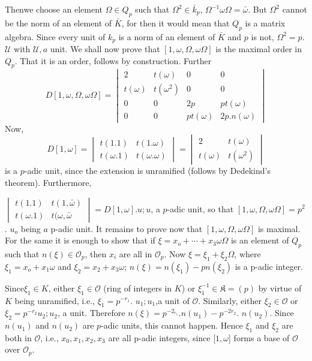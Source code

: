 Then\pageoriginale we choose an element $\Omega \in Q_p$ such that $\Omega^{2}\in
\bar{k}_p$, $\Omega^{-1} \omega \Omega = \bar{\omega}$. But $\Omega^2$
cannot be the norm of an 
element of $\bar{K}$, for then it would mean that $Q_p$ is a matrix
algebra. Since every unit of $k_p$ is a norm of an element of
$\bar{K}$ and $p$ is not, $\Omega^2=p$. $\mathcal{U}$ with
$\mathcal{U},a$ unit. We shall now prove  that $[1, \omega, \Omega,
  \omega \Omega]$ is the maximal order in $Q_p$. That it is an order,
follows by  construction. Further 
$$
D [1, \omega, \Omega, \omega \Omega]=
\begin{vmatrix}
  2 & t(\omega) & 0 &0 \\
  t(\omega) & t(\omega^2) & 0 & 0 \\
  0 & 0 & 2p & pt(\omega) \\
  0 & 0 & pt(\omega) & 2p.n(\omega) 
\end{vmatrix}
$$
Now,
$$
D[1,\omega] = 
\begin{vmatrix}
  t(1.1) & t(1. \omega) \\
  t(\omega. 1) & t(\omega. \omega)
\end{vmatrix} 
=
\begin{vmatrix}
  2 & t(\omega) \\ 
  t(\omega) & t(\omega^2)
\end{vmatrix}
$$
is a $p$-adic unit, since the extension is  unramified (follows by
Dedekind's theorem).  Furthermore, 

$
\begin{vmatrix}
  t(1.1) & t(1, \bar{\omega}) \\
  t(\omega.1) & t(\omega,  \bar{\omega}
\end{vmatrix}
= D[1,\omega]. u; u$,  a  $p$-adic unit,
so that $[1, \omega, \Omega, \omega \Omega]=p^2$. $u_o$ being $a$
p-adic unit. It remains to prove now that $[1, \omega, \Omega, \omega
  \Omega]$ is maximal. For the same it is enough to show that if $\xi
= x_o + \cdots + x_3 \omega \Omega$ is an element of $Q_p$ such that
$n (\xi) \in  \mathscr{O}_p$, then $x_i$ are all in
$\mathscr{O}_p$. Now $\xi = \xi_1 +  \xi_2 \Omega$, where $\xi_1 = x_o
+x_1 \omega$ and $\xi_2 =  x_2 +x_3 \omega$;  $n(\xi)= n(\xi_1)- pn
(\xi_2)$ is a p-adic integer. 

Since\pageoriginale $\xi_1 \in K $, either $\xi_1 \in  \mathscr{O}$ (ring of
integers in $K$) or $\xi^{-1}_1 \in \mathfrak{K} =(p)$ by virtue of $K$
being unramified, i.e., $\xi_1= p^{-r_1}$.  $u_1 ; u_1$,a  unit  of
$\mathscr{O}$. Similarly, either $\xi_2 \in \mathscr{O}$ or $\xi_2
=p^{-r_2} u_2; u_2$,  a unit. Therefore $n(\xi)= p^{-2_{r_1}}.
n(u_1)-p^{-2{r_2}}$. $n(u_2)$. Since $n(u_1)$ and $n(u_2)$ are
$p$-adic units, this cannot happen. Hence $\xi_1$ and $\xi_2$ are both
in $\mathscr{O}$, i.e., $x_0, x_1, x_2,x_3$ are all p-adic integers,
since [$1, \omega$] forms a base of $\mathscr{O}$ over
$\mathscr{O}_p$. 

